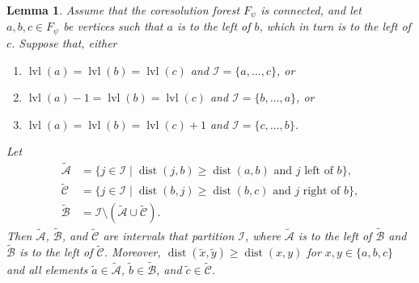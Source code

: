 \documentclass[a4paper]{amsart}
\newtheorem{lemma}[theorem]{Lemma}
\theoremstyle{definition}
\theoremstyle{remark}
\numberwithin{equation}{theorem}
\newcommand{\dist}{\operatorname{dist}}
\newcommand{\level}{\operatorname{lvl}}
\newcommand{\psiforest}{F_\psi}
\begin{document}
\begin{lemma}\label{lemma:minimal-distance}
  Assume that the coresolution forest $\psiforest$ is connected, and
  let $a , b , c \in \psiforest$ be vertices such that $a$ is to the left of $b$, which in turn is to the left of $c$.  Suppose that, either
  \begin{enumerate}[\rm(i)]
  \item\label{order:abc} $\level(a) = \level(b) = \level(c)$ and
    $\mathcal I = \{a,\dots,c\}$, or
  \item\label{order:bca} $\level(a) - 1 = \level(b) = \level(c)$ and
    $\mathcal I = \{b,\dots,a\}$, or
  \item\label{order:cab} $\level(a) = \level(b) = \level(c) + 1$ and
    $\mathcal I = \{c,\dots,b\}$.
  \end{enumerate}
  Let
  \begin{align*}
    \tilde{\mathcal A} &= \{j\in\mathcal I\mid\dist(j, b)\geq\dist(a, b)\text{ and $j$ left of $b$}\},\\
    \tilde{\mathcal C} &= \{j\in\mathcal I\mid\dist(b, j)\geq\dist(b, c)\text{ and $j$ right of $b$}\},\\
    \tilde{\mathcal B} &= \mathcal I\setminus(\tilde{\mathcal A}\cup\tilde{\mathcal C}).
  \end{align*}
  Then $\tilde{\mathcal A}$, $\tilde{\mathcal B}$, and $\tilde{\mathcal C}$ are intervals that partition $\mathcal I$, where $ \tilde{\mathcal A} $ is to the left of $ \tilde{\mathcal B} $ and $ \tilde{\mathcal B} $ is to the left of $ \tilde{\mathcal C} $.
Moreover, $\dist(\tilde x, \tilde y)\geq\dist(x, y)$ for $x, y\in\{a, b, c\}$ and all elements $\tilde a\in\tilde{\mathcal A}$, $\tilde b\in\tilde{\mathcal B}$, and $\tilde c\in\tilde{\mathcal C}$.
\end{lemma}
\end{document}
